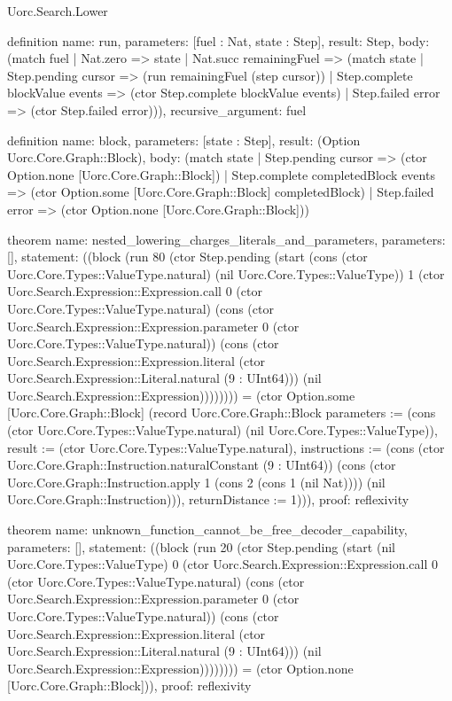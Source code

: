 \begin{lexlean}{Uorc.Search.Lower}
\begin{semanticmodule}
definition{
  name: run,
  parameters: [fuel : Nat, state : Step],
  result: Step,
  body: (match fuel
    | Nat.zero => state
    | Nat.succ remainingFuel => (match state
      | Step.pending cursor => (run remainingFuel (step cursor))
      | Step.complete blockValue events => (ctor Step.complete blockValue events)
      | Step.failed error => (ctor Step.failed error))),
  recursive_argument: fuel
}

definition{
  name: block,
  parameters: [state : Step],
  result: (Option Uorc.Core.Graph::Block),
  body: (match state
    | Step.pending cursor => (ctor Option.none [Uorc.Core.Graph::Block])
    | Step.complete completedBlock events => (ctor Option.some [Uorc.Core.Graph::Block] completedBlock)
    | Step.failed error => (ctor Option.none [Uorc.Core.Graph::Block]))
}

theorem{
  name: nested_lowering_charges_literals_and_parameters,
  parameters: [],
  statement: ((block (run 80 (ctor Step.pending (start (cons (ctor Uorc.Core.Types::ValueType.natural) (nil Uorc.Core.Types::ValueType)) 1 (ctor Uorc.Search.Expression::Expression.call 0 (ctor Uorc.Core.Types::ValueType.natural) (cons (ctor Uorc.Search.Expression::Expression.parameter 0 (ctor Uorc.Core.Types::ValueType.natural)) (cons (ctor Uorc.Search.Expression::Expression.literal (ctor Uorc.Search.Expression::Literal.natural (9 : UInt64))) (nil Uorc.Search.Expression::Expression)))))))) = (ctor Option.some [Uorc.Core.Graph::Block] (record Uorc.Core.Graph::Block {parameters := (cons (ctor Uorc.Core.Types::ValueType.natural) (nil Uorc.Core.Types::ValueType)), result := (ctor Uorc.Core.Types::ValueType.natural), instructions := (cons (ctor Uorc.Core.Graph::Instruction.naturalConstant (9 : UInt64)) (cons (ctor Uorc.Core.Graph::Instruction.apply 1 (cons 2 (cons 1 (nil Nat)))) (nil Uorc.Core.Graph::Instruction))), returnDistance := 1}))),
  proof: reflexivity{}
}

theorem{
  name: unknown_function_cannot_be_free_decoder_capability,
  parameters: [],
  statement: ((block (run 20 (ctor Step.pending (start (nil Uorc.Core.Types::ValueType) 0 (ctor Uorc.Search.Expression::Expression.call 0 (ctor Uorc.Core.Types::ValueType.natural) (cons (ctor Uorc.Search.Expression::Expression.parameter 0 (ctor Uorc.Core.Types::ValueType.natural)) (cons (ctor Uorc.Search.Expression::Expression.literal (ctor Uorc.Search.Expression::Literal.natural (9 : UInt64))) (nil Uorc.Search.Expression::Expression)))))))) = (ctor Option.none [Uorc.Core.Graph::Block])),
  proof: reflexivity{}
}
\end{semanticmodule}
\end{lexlean}
